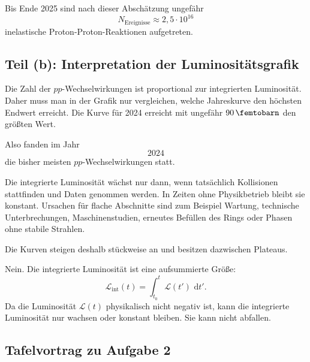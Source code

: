 \documentclass[11pt,a4paper]{scrartcl}
\newcommand{\dd}{\,\mathrm{d}}
\newcommand{\lum}{\mathcal{L}}
\theoremstyle{definition}
\theoremstyle{plain}
\theoremstyle{remark}
\begin{document}
\begin{answerbox}
Bis Ende 2025 sind nach dieser Abschätzung ungefähr
\[
    \boxed{N_{\mathrm{Ereignisse}}\approx 2{,}5\cdot10^{16}}
\]
inelastische Proton-Proton-Reaktionen aufgetreten.
\end{answerbox}

\subsection{Teil (b): Interpretation der Luminositätsgrafik}

\begin{solutionbox}[title=Frage 1: In welchem Jahr fanden die meisten \(pp\)-Wechselwirkungen statt?]
Die Zahl der \(pp\)-Wechselwirkungen ist proportional zur integrierten Luminosität. Daher muss man in der Grafik nur vergleichen, welche Jahreskurve den höchsten Endwert erreicht. Die Kurve für 2024 erreicht mit ungefähr \(\SI{90}{\per\femtobarn}\) den größten Wert.

Also fanden im Jahr
\[
    \boxed{2024}
\]
die bisher meisten \(pp\)-Wechselwirkungen statt.
\end{solutionbox}

\begin{solutionbox}[title=Frage 2: Warum steigen die Verläufe nicht kontinuierlich an?]
Die integrierte Luminosität wächst nur dann, wenn tatsächlich Kollisionen stattfinden und Daten genommen werden. In Zeiten ohne Physikbetrieb bleibt sie konstant. Ursachen für flache Abschnitte sind zum Beispiel Wartung, technische Unterbrechungen, Maschinenstudien, erneutes Befüllen des Rings oder Phasen ohne stabile Strahlen.

Die Kurven steigen deshalb stückweise an und besitzen dazwischen Plateaus.
\end{solutionbox}

\begin{solutionbox}[title=Frage 3: Könnte so ein Verlauf abfallen?]
Nein. Die integrierte Luminosität ist eine aufsummierte Größe:
\[
    \lum_{\mathrm{int}}(t)=\int_{t_0}^{t}\lum(t')\,\dd t'.
\]
Da die Luminosität \(\lum(t)\) physikalisch nicht negativ ist, kann die integrierte Luminosität nur wachsen oder konstant bleiben. Sie kann nicht abfallen.
\end{solutionbox}

\subsection{Tafelvortrag zu Aufgabe 2}
\end{document}
